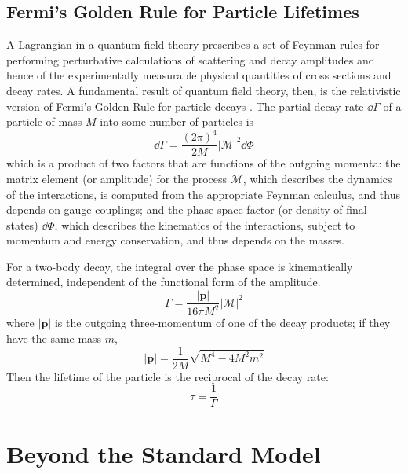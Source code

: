 \subsection{Fermi's Golden Rule for Particle Lifetimes}
A Lagrangian in a quantum field theory prescribes a set of Feynman rules for performing perturbative calculations of scattering and decay amplitudes and hence of the experimentally measurable physical quantities of cross sections and decay rates.
A fundamental result of quantum field theory, then, is the relativistic version of Fermi's Golden Rule for particle decays \cite{Griffiths, PDG:Kinematics}.
The partial decay rate $\dd\Gamma$ of a particle of mass $M$ into some number of particles is
\begin{equation}
  \dd\Gamma = \frac{(2\pi)^4}{2M}\left|\mathcal{M}\right|^2\dd \Phi
  \label{eq:sm:fgr}
\end{equation}
which is a product of two factors that are functions of the outgoing momenta: the matrix element (or amplitude) for the process $\mathcal{M}$, which describes the dynamics of the interactions, is computed from the appropriate Feynman calculus, and thus depends on gauge couplings; and the phase space factor (or density of final states) $\dd\Phi$, which describes the kinematics of the interactions, subject to momentum and energy conservation, and thus depends on the masses.

For a two-body decay, the integral over the phase space is kinematically determined, independent of the functional form of the amplitude.
\begin{equation}
  \Gamma = \frac{|\mathbf{p}|}{16\pi M^2}\left|\mathcal{M}\right|^2 
  \label{eq:sm:fermi}
\end{equation}
where $|\mathbf{p}|$ is the outgoing three-momentum of one of the decay products; if they have the same mass $m$,
\begin{equation}
  |\mathbf{p}| = \frac{1}{2M}\sqrt{M^4 - 4M^2m^2}
  \label{eq:sm:p}
\end{equation}
Then the lifetime of the particle is the reciprocal of the decay rate:
\begin{equation}
  \tau = \frac{1}{\Gamma}
  \label{eq:sm:lifetime}
\end{equation}

\section{Beyond the Standard Model}
